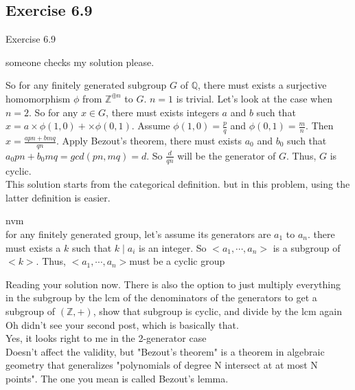 \documentclass[15pt]{scrartcl}
\begin{document}
\subsection{Exercise 6.9}
\begin{discussion*}Exercise 6.9
    \begin{abboy*}
        someone checks my solution please. 

        So for any finitely generated subgroup $G$ of $\mathbb{Q}$, there must exists a surjective homomorphism $\phi$ from $\mathbb{Z}^{\oplus n}$ to $G$. $n=1$ is trivial. Let's look at the case when $n=2$. So for any $x\in G$, there must exists integers $a$ and $b$ such that $x=a \times \phi(1,0)+ \times \phi(0,1)$. Assume $\phi(1,0)=\frac{p}{q}$ and $\phi(0,1)=\frac{m}{n}$. Then $x=\frac{apn+bmq}{qn}$. Apply Bezout's theorem, there must exists $a_0$ and $b_0$ such that $a_0pn+b_0mq=gcd(pn,mq)=d$. So $\frac{d}{qn}$ will be the generator of $G$. Thus, $G$ is cyclic.
        \\

        This solution starts from the categorical definition. but in this problem, using the latter definition is easier.
    \end{abboy*}
    \begin{abboy*}
        nvm
        \\
        for any finitely generated group, let's assume its generators are $a_1$ to $a_n$. there must exists a $k$ such that $k\mid a_i$ is an integer. So $<a_1, \cdots ,a_n>$ is a subgroup of $<k>$. Thus, $<a_1, \cdots , a_n>  $must be a cyclic group
        \\
    \end{abboy*}
    \begin{evie*}
        Reading your solution now. There is also the option to just multiply everything in the subgroup by the lcm of the denominators of the generators to get a subgroup of $(\mathbb{Z},+)$, show that subgroup is cyclic, and divide by the lcm again
        \\
        Oh didn't see your second post, which is basically that.
        \\
        Yes, it looks right to me in the 2-generator case
        \\
        Doesn't affect the validity, but "Bezout's theorem" is a theorem in algebraic geometry that generalizes "polynomials of degree N intersect at at most N points". The one you mean is called Bezout's lemma.
    \end{evie*}
\end{discussion*}
\end{document}
